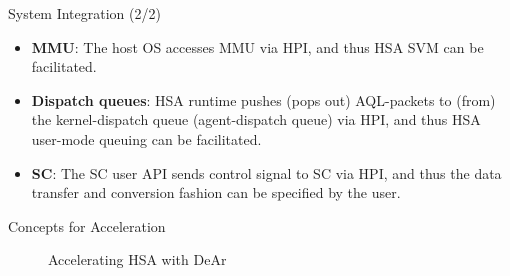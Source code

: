 \documentclass{beamer}
\begin{document}
\begin{CJK}{UTF8}{bkai}
    \begin{frame}{System Integration (2/2)}
        \begin{itemize}
            \item {
                    \textbf{MMU}: The host OS accesses MMU via HPI, and thus HSA SVM can be facilitated.
                }
            \item {
                    \textbf{Dispatch queues}: HSA runtime pushes (pops out) AQL-packets to (from) the kernel-dispatch queue (agent-dispatch queue) via HPI, 
                    and thus HSA user-mode queuing can be facilitated.
                }

            \item {
                    \textbf{SC}: The SC user API sends control signal to SC via HPI, 
                    and thus the data transfer and conversion fashion can be specified by the user.
                }
        \end{itemize}
    \end{frame}

    \begin{frame}{Concepts for Acceleration}
        \begin{figure}[!ht]
            \begin{center}
                \hfill
            \end{center}
            \caption{Accelerating HSA with DeAr}
            \label{fig:bb}
        \end{figure}
    \end{frame}



\end{CJK}
\end{document}
